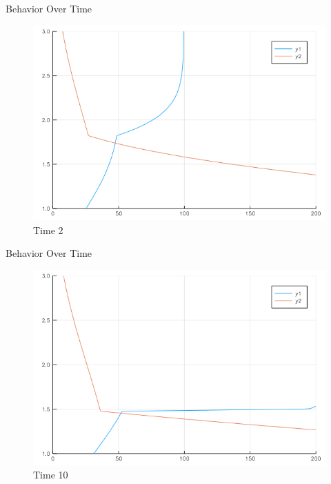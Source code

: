\documentclass[bigger]{beamer}
\begin{document}
\begin{frame}[label=sec-1-31]{Behavior Over Time}
\begin{figure}[htb]
\centering
\includegraphics[width=.9\linewidth]{../Plots/gif/000002.png}
\caption{Time 2}
\end{figure}
\end{frame}


\begin{frame}[label=sec-1-32]{Behavior Over Time}
\begin{figure}[htb]
\centering
\includegraphics[width=.9\linewidth]{../Plots/gif/000010.png}
\caption{Time 10}
\end{figure}
\end{frame}
\end{document}
